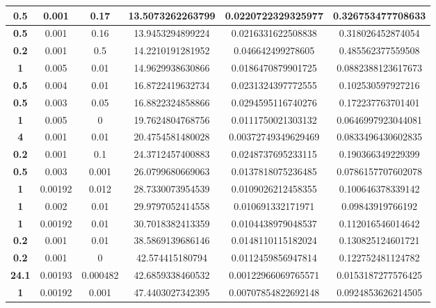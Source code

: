 \begin{table}[]
\begin{tabular}{|S|S|S|S|S|S|}
		\textbf{0.5}  & 0.001   & 0.17        & 13.5073262263799   & 0.0220722329325977   & 0.326753477708633     \\ \hline
		\textbf{0.5}  & 0.001   & 0.16        & 13.9453294899224   & 0.0216331622508838   & 0.318026452874054     \\ \hline
		\textbf{0.2}  & 0.001   & 0.5         & 14.2210191281952   & 0.046642499278605    & 0.485562377559508     \\ \hline
		\textbf{1}    & 0.005   & 0.01        & 14.9629938630866   & 0.0186470879901725   & 0.0882388123617673    \\ \hline
		\textbf{0.5}  & 0.004   & 0.01        & 16.8722419632734   & 0.0231324397772555   & 0.102530597927216     \\ \hline
		\textbf{0.5}  & 0.003   & 0.05        & 16.8822324858866   & 0.0294595116740276   & 0.172237763701401     \\ \hline
		\textbf{1}    & 0.005   & 0           & 19.7624804768756   & 0.0111750021303132   & 0.0646997923044081    \\ \hline
		\textbf{4}    & 0.001   & 0.01        & 20.4754581480028   & 0.00372749349629469  & 0.0833496430602835    \\ \hline
		\textbf{0.2}  & 0.001   & 0.1         & 24.3712457400883   & 0.0248737695233115   & 0.190366349229399     \\ \hline
		\textbf{0.5}  & 0.003   & 0.001       & 26.0799680669063   & 0.0137818075236485   & 0.0786157707602078    \\ \hline
		\textbf{1}    & 0.00192 & 0.012       & 28.7330073954539   & 0.0109026212458355   & 0.100646378339142     \\ \hline
		\textbf{1}    & 0.002   & 0.01        & 29.9797052414558   & 0.010691332171971    & 0.09843919766192      \\ \hline
		\textbf{1}    & 0.00192 & 0.01        & 30.7018382413359   & 0.0104438979048537   & 0.112016546014642     \\ \hline
		\textbf{0.2}  & 0.001   & 0.01        & 38.5869139686146   & 0.0148110115182024   & 0.130825124601721     \\ \hline
		\textbf{0.2}  & 0.001   & 0           & 42.574415180794    & 0.0112459856947814   & 0.122752481124782     \\ \hline
		\textbf{24.1} & 0.00193 & 0.000482    & 42.6859338460532   & 0.00122966069765571  & 0.0153187277576425    \\ \hline
		\textbf{1}    & 0.00192 & 0.001       & 47.4403027342395   & 0.00707854822692148  & 0.0924853626214505    \\ \hline

\end{tabular}
\end{table}
